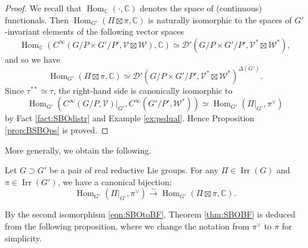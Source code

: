 \begin{proof}
We recall
 that ${\operatorname{Hom}}_{{\mathbb{C}}}(\cdot, {\mathbb{C}})$ denotes 
 the space of (continuous) functionals.  
Then ${\operatorname{Hom}}_{G'}(\Pi \boxtimes \pi,{\mathbb{C}})$
 is naturally isomorphic 
 to the spaces of $G'$-invariant elements
 of the following vector spaces
\[
   {\operatorname{Hom}}_{{\mathbb{C}}}
   (C^{\infty}(G/P \times G'/P', {\mathcal{V}} \boxtimes {\mathcal{W}}), {\mathbb{C}})
   \simeq
   {\mathcal{D}}'(G/P \times G'/P', {\mathcal{V}}^{\ast} \boxtimes {\mathcal{W}}^{\ast}), 
\]
 and so we have
\[
   {\operatorname{Hom}}_{G'}(\Pi \boxtimes \pi,{\mathbb{C}})
    \simeq
    {\mathcal{D}}'(G/P \times G'/P', {\mathcal{V}}^{\ast} \boxtimes {\mathcal{W}}^{\ast})^{\Delta(G')}.  
\]
Since $\tau^{\ast\ast} \simeq \tau$, 
 the right-hand side is canonically isomorphic to 
\[{\operatorname{Hom}}_{G'}
   (C^{\infty}(G/P, {\mathcal{V}})|_{G'}, C^{\infty}(G'/P',{\mathcal{W}}^{\ast}))
\simeq 
{\operatorname{Hom}}_{G'}(\Pi|_{G'}, \pi^{\vee})
\]
 by Fact \ref{fact:SBOdistr} and Example \ref{ex:psdual}.  
Hence Proposition \ref{prop:BSBOps} is proved.  
\end{proof}
More generally,
 we obtain the following.  
\begin{theorem}
\label{thm:SBOBF}
Let $G \supset G'$ be a pair of real reductive Lie groups.  
For any $\Pi \in {\operatorname{Irr}}(G)$
 and $\pi \in {\operatorname{Irr}}(G')$, 
 we have a canonical bijection:
\begin{equation}\label{eqn:SBOBF}
   {\operatorname{Hom}}_{G'}(\Pi|_{G'}, \pi^{\vee})
   \overset \sim \rightarrow
   {\operatorname{Hom}}_{G'}(\Pi \boxtimes \pi,{\mathbb{C}}).  
\end{equation}
\end{theorem}
By the second isomorphism \eqref{eqn:SBOtoBF}, 
Theorem \ref{thm:SBOBF} is deduced from the following proposition, 
 where we change the notation from 
 $\pi^{\vee}$ to $\pi$ for simplicity.  


